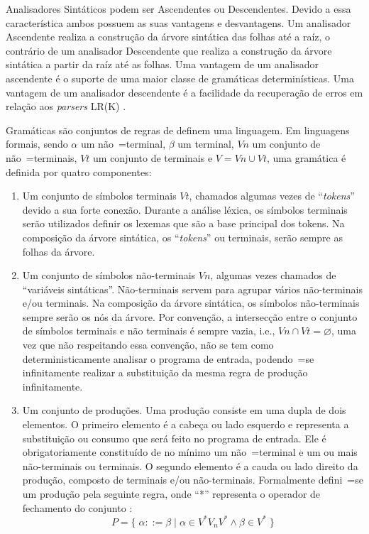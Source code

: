 {    Analisadores Sintáticos podem ser Ascendentes ou Descendentes.
    Devido a essa característica ambos possuem as suas vantagens e
    desvantagens.
    Um analisador Ascendente realiza a construção da árvore sintática das folhas até a raíz,
    o contrário de um analisador Descendente que realiza a construção
    da árvore sintática a partir da raíz até as folhas.
    Uma vantagem de um analisador ascendente é o suporte
    de uma maior classe de gramáticas determinísticas.
    Uma vantagem de um analisador descendente é a facilidade da recuperação de erros em relação
    aos \textit{parsers} LR(K) \cite{sippu1982,lr1ErrorRecovery,larkJosefGrosch}.

    Gramáticas são conjuntos de regras de definem uma linguagem.
    Em linguagens formais,
    sendo $\alpha$ um não~=terminal,
    $\beta$ um terminal,
    $Vn$ um conjunto de não~=terminais,
    $Vt$ um conjunto de terminais e
    $V = Vn \cup Vt$,
    uma gramática é definida por quatro componentes:
    \begin{enumerate}%
        \item Um conjunto de símbolos terminais $Vt$,
        chamados algumas vezes de ``\textit{tokens}'' devido a sua forte conexão.
        Durante a análise léxica,
        os símbolos terminais serão utilizados definir os lexemas que são a base principal dos tokens.
        Na composição da árvore sintática,
        os ``\textit{tokens}'' ou terminais,
        serão sempre as folhas da árvore.

        \item Um conjunto de símbolos não-terminais $Vn$,
        algumas vezes chamados de ``variáveis sintáticas''.
        Não-terminais servem para agrupar vários não-terminais e/ou terminais.
        Na composição da árvore sintática,
        os símbolos não-terminais sempre serão os nós da árvore.
        Por convenção,
        a intersecção entre o conjunto de símbolos terminais e
        não terminais é sempre vazia, i.e., $Vn \cap Vt = \varnothing$,
        uma vez que não respeitando essa convenção,
        não se tem como deterministicamente analisar o programa de entrada,
        podendo~=se infinitamente realizar a substituição da mesma regra de produção infinitamente.

        \item \label{definicaoDeGramatica}Um conjunto de produções.
        Uma produção consiste em uma dupla de dois elementos.
        O primeiro elemento é a cabeça ou lado esquerdo e
        representa a substituição ou consumo que será feito no programa de entrada.
        Ele é obrigatoriamente constituído de no mínimo um não~=terminal e
        um ou mais não-terminais ou terminais.
        O segundo elemento é a cauda ou lado direito da produção,
        composto de terminais e/ou não-terminais.
        Formalmente defini~=se um produção pela seguinte regra,
        onde ``*'' representa o operador de fechamento do conjunto \cite{hopcroftBook}:
        $$ P = \{\; \alpha ::= \beta \;|\; \alpha \in V^* V_n V^* \land \beta \in V^* \;\} $$


\end{enumerate}}
